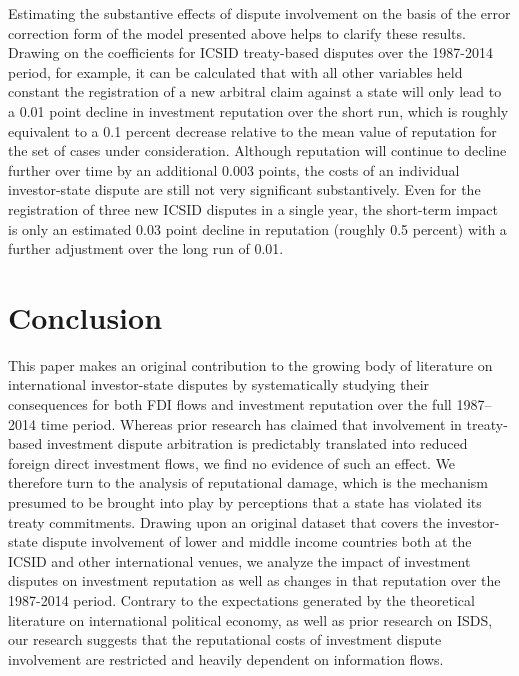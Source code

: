 \documentclass[12pt,onesided]{amsart}
\begin{document}

Estimating the substantive effects of dispute involvement on the basis of the error correction form of the model presented above helps to clarify these results. Drawing on the coefficients for ICSID treaty-based disputes over the 1987-2014 period, for example, it can be calculated that with all other variables held constant the registration of a new arbitral claim against a state will only lead to a 0.01 point decline in investment reputation over the short run, which is roughly equivalent to a 0.1 percent decrease relative to the mean value of reputation for the set of cases under consideration. Although reputation will continue to decline further over time by an additional 0.003 points, the costs of an individual investor-state dispute are still not very significant substantively. Even for the registration of three new ICSID disputes in a single year, the short-term impact is only an estimated 0.03 point decline in reputation (roughly 0.5 percent) with a further adjustment over the long run of 0.01. 

\section*{Conclusion}

This paper makes an original contribution to the growing body of literature on international investor-state disputes by systematically studying their consequences for both FDI flows and investment reputation over the full 1987--2014 time period. Whereas prior research has claimed that involvement in treaty-based investment dispute arbitration is predictably translated into reduced foreign direct investment flows, we find no evidence of such an effect. We therefore turn to the analysis of reputational damage, which is the mechanism presumed to be brought into play by perceptions that a state has violated its treaty commitments. Drawing upon an original dataset that covers the investor-state dispute involvement of lower and middle income countries both at the ICSID and other international venues, we analyze the impact of investment disputes on investment reputation as well as changes in that reputation over the 1987-2014 period. Contrary to the expectations generated by the theoretical literature on international political economy, as well as prior research on ISDS, our research suggests that the reputational costs of investment dispute involvement are restricted and heavily dependent on information flows. 
\end{document}
